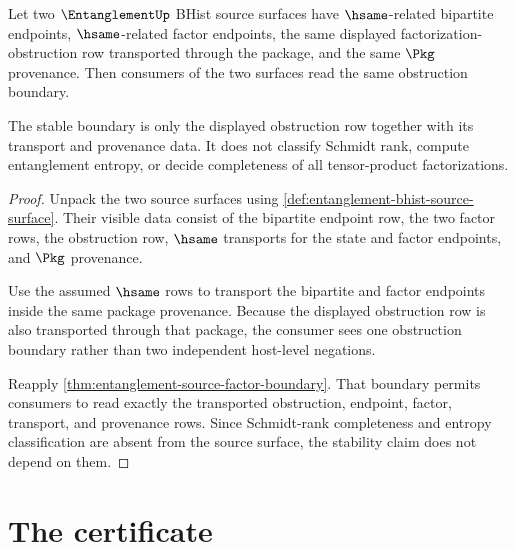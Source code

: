 \begin{theorem}
\label{thm:entanglement-obstruction-transport-stability}
Let two $\EntanglementUp$ BHist source surfaces have $\hsame$-related
bipartite endpoints, $\hsame$-related factor endpoints, the same displayed
factorization-obstruction row transported through the package, and the same
$\Pkg$ provenance. Then consumers of the two surfaces read the same
obstruction boundary.

The stable boundary is only the displayed obstruction row together with its
transport and provenance data. It does not classify Schmidt rank, compute
entanglement entropy, or decide completeness of all tensor-product
factorizations.
\end{theorem}
\begin{proof}
Unpack the two source surfaces using
\autoref{def:entanglement-bhist-source-surface}. Their visible data consist of
the bipartite endpoint row, the two factor rows, the obstruction row,
$\hsame$ transports for the state and factor endpoints, and $\Pkg$ provenance.

Use the assumed $\hsame$ rows to transport the bipartite and factor endpoints
inside the same package provenance. Because the displayed obstruction row is
also transported through that package, the consumer sees one obstruction
boundary rather than two independent host-level negations.

Reapply \autoref{thm:entanglement-source-factor-boundary}. That boundary
permits consumers to read exactly the transported obstruction, endpoint,
factor, transport, and provenance rows. Since Schmidt-rank completeness and
entropy classification are absent from the source surface, the stability claim
does not depend on them.
\end{proof}

\section{The certificate}
\label{sec:entanglement-certificate}

